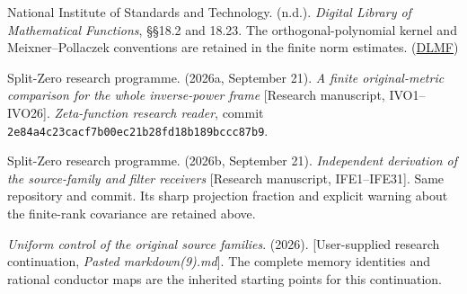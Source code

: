 \documentclass[11pt]{article}
\begin{document}
National Institute of Standards and Technology. (n.d.). \emph{Digital Library of Mathematical Functions}, §§18.2 and 18.23. The orthogonal-polynomial kernel and Meixner--Pollaczek conventions are retained in the finite norm estimates. (\href{https://dlmf.nist.gov/18.23}{DLMF})

Split-Zero research programme. (2026a, September 21). \emph{A finite original-metric comparison for the whole inverse-power frame} {[}Research manuscript, IVO1--IVO26{]}. \emph{Zeta-function research reader}, commit \nolinkurl{2e84a4c23cacf7b00ec21b28fd18b189bccc87b9}.

Split-Zero research programme. (2026b, September 21). \emph{Independent derivation of the source-family and filter receivers} {[}Research manuscript, IFE1--IFE31{]}. Same repository and commit. Its sharp projection fraction and explicit warning about the finite-rank covariance are retained above.

\emph{Uniform control of the original source families}. (2026). {[}User-supplied research continuation, \emph{Pasted markdown(9).md}{]}. The complete memory identities and rational conductor maps are the inherited starting points for this continuation.
\end{document}
